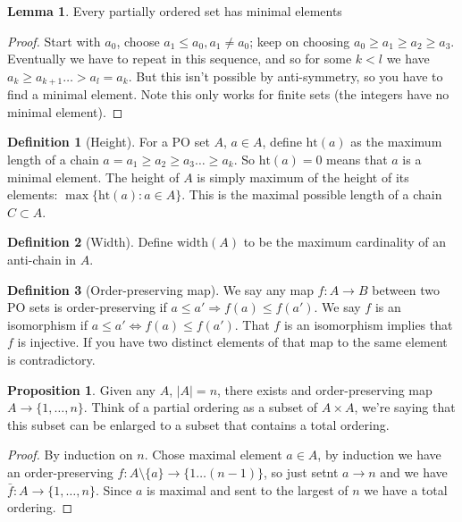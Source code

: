 \documentclass[12pt]{article}
\theoremstyle{definition}
\newtheorem{defn}{Definition}
\newtheorem{prop}{Proposition}
\newtheorem{lemma}[theorem]{Lemma}
\begin{document}
\begin{lemma}
    Every partially ordered set has minimal elements
\end{lemma}

\begin{proof}
    Start with $a_0$, choose $a_1 \le a_0, a_1 \ne a_0$; keep on choosing $a_0
    \ge a_1 \ge a_2 \ge a_3$. Eventually we have to repeat in this sequence,
    and so for some $k < l$ we have $a_k \ge a_{k + 1} \ldots > a_l = a_k$. But
    this isn't possible by anti-symmetry, so you have to find a minimal
    element. Note this only works for finite sets (the integers have no minimal
    element).
\end{proof}

\begin{defn}[Height]
    For a PO set $A$, $a \in A$, define $\mathrm{ht}(a)$ as the maximum length
    of a chain $a = a_1 \ge a_2 \ge a_3 \ldots \ge a_k$. So $\mathrm{ht}(a) =
    0$ means that $a$ is a minimal element. The height of $A$ is simply maximum
    of the height of its elements: $\max \{\mathrm{ht}(a) : a \in A\}$. This is
    the maximal possible length of a chain $C \subset A$.
\end{defn}

\begin{defn}[Width]
    Define $\mathrm{width}(A)$ to be the maximum cardinality of an anti-chain
    in $A$. 
\end{defn}

\begin{defn}[Order-preserving map]
    We say any map $f: A \rightarrow B$ between two PO sets is order-preserving
    if $a \le a' \Rightarrow f(a) \le f(a')$. We say $f$ is an isomorphism if
    $a \le a' \Leftrightarrow f(a) \le f(a')$. That $f$ is an isomorphism
    implies that $f$ is injective. If you have two distinct elements of that
    map to the same element is contradictory.
\end{defn}

\begin{prop}
    Given any $A$, $|A| = n$, there exists and order-preserving map $A
    \rightarrow \{1, \ldots, n\}$. Think of a partial ordering as a subset of
    $A \times A$, we're saying that this subset can be enlarged to a subset
    that contains a total ordering.
\end{prop}

\begin{proof}
    By induction on $n$. Chose maximal element $a \in A$, by induction we have
    an order-preserving $f: A \setminus \{a\} \rightarrow \{1 \ldots (n-1) \}$,
    so just setnt $a \rightarrow n$ and we have $\bar{f}: A \rightarrow \{1,
    \ldots, n\}$. Since $a$ is maximal and sent to the largest of $n$ we have a
    total ordering.
\end{proof}
\end{document}
